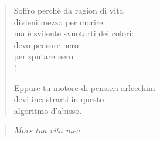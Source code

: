 
\begin{verse}
    Soffro perchè da ragion di vita\\
    divieni mezzo per morire\\
    ma è svilente svuotarti dei colori:\\
    devo pensare nero\\
    per sputare nero\\!

    Eppure tu motore di pensieri arlecchini\\
    devi incastrarti in questo\\
    algoritmo d'abisso.\\
\end{verse}
\begin{verse}
    \hfill \textit{Mors tua vita mea.}
\end{verse}